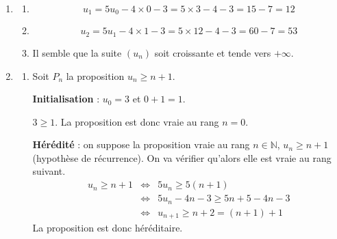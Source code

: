 \begin{enumerate}
	\item
	\begin{enumerate}
		\item \[u_1 = 5u_0 - 4 \times 0 - 3 = 5 \times 3 - 4 - 3 = 15 - 7 = \boxed{12}\]
		\item \[u_2 = 5u_1 - 4 \times 1 - 3 = 5 \times 12 - 4 - 3 = 60 - 7 = \boxed{53}\]
		\item Il semble que la suite $\left(u_n\right)$ soit croissante et tende vers $+\infty$.
	\end{enumerate}
	\item
	\begin{enumerate}
		\item Soit $P_n$ la proposition $u_n \geqslant n+1$.
		
\textbf{Initialisation} : $u_0 = 3$ et $0+1 = 1$.
		
$3 \geqslant 1$. La proposition est donc vraie au rang $n=0$.\\
\smallskip
		
\textbf{Hérédité} : on suppose la proposition vraie au rang $n \in \mathbb{N}$,\: $u_n \geqslant n + 1$ (hypothèse de récurrence). On va vérifier qu'alors elle est vraie au rang suivant.
\begin{eqnarray*}
u_n \geqslant n + 1 &\iff& 5u_n \geqslant 5(n+1)\\
&\iff& 5u_n - 4n - 3 \geqslant 5n + 5 - 4n - 3\\
&\iff& u_{n+1} \geqslant n + 2 = (n+1) + 1
\end{eqnarray*}
La proposition est donc héréditaire.\\
		\smallskip
		

\end{enumerate}
\end{enumerate}

